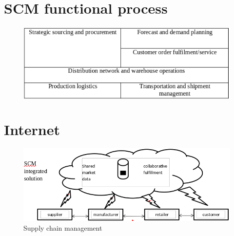 \documentclass[12pt, a4paper]{article}
\begin{document}
\section{SCM functional process}
\begin{figure}[ht]
  \includegraphics[width=\columnwidth]{scmfuncproc}
\end{figure}


\section{Internet}
\begin{figure}[ht]
  \includegraphics[width=\columnwidth]{scminter}
  \caption{Supply chain management}
\end{figure}
\end{document}
